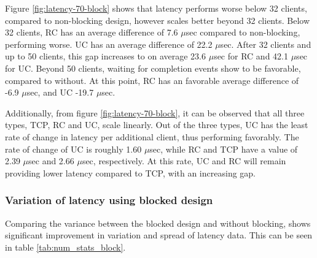 Figure \ref{fig:latency-70-block} shows that latency performs worse below 32 clients, compared to non-blocking design, however scales better beyond 32 clients.
Below 32 clients, RC has an average difference of 7.6 $\mu$sec compared to non-blocking, performing worse.
UC has an average difference of 22.2 $\mu$sec.
After 32 clients and up to 50 clients, this gap increases to on average 23.6 $\mu$sec for RC and 42.1 $\mu$sec for UC.
Beyond 50 clients, waiting for completion events show to be favorable, compared to without.
At this point, RC has an favorable average difference of -6.9 $\mu$sec, and UC -19.7 $\mu$sec.

Additionally, from figure \ref{fig:latency-70-block}, it can be observed that all three types, TCP, RC and UC, scale linearly.
Out of the three types, UC has the least rate of change in latency per additional client, thus performing favorably.
The rate of change of UC is roughly 1.60 $\mu$sec, while RC and TCP have a value of 2.39 $\mu$sec and 2.66 $\mu$sec, respectively.
At this rate, UC and RC will remain providing lower latency compared to TCP, with an increasing gap.


\subsubsection{Variation of latency using blocked design}
Comparing the variance between the blocked design and without blocking, shows significant improvement in variation and spread of latency data.
This can be seen in table \ref{tab:num_stats_block}.

